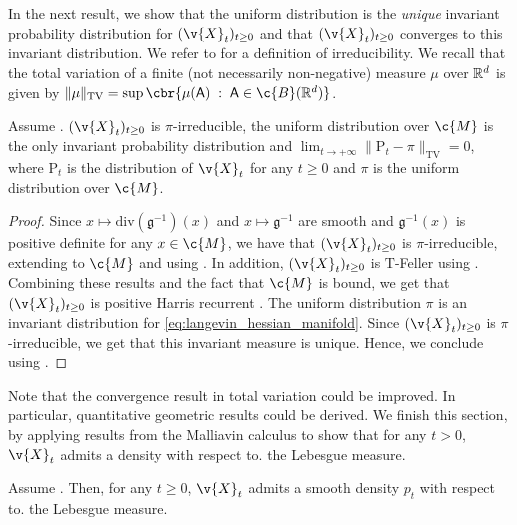 In the next result, we show that the uniform distribution is the \emph{unique} invariant probability distribution for \((\v{X}_t)_{t \geq 0}\) and that \((\v{X}_t)_{t \geq 0}\) converges to this invariant distribution.
We refer to \cite[Section 2, p.490]{meyn1993stability} for a definition of irreducibility.
We recall that the total variation of a finite (not necessarily non-negative) measure \(\mu\) over \(\mathbb{R}^d\) is given by \(\| \mu \|_{\mathrm{TV}} = \sup \cbr{\mu(\mathsf{A}) \; : \; \mathsf{A} \in \c{B}(\R^d)}\).

\begin{proposition}
	Assume \textup{}.
	\((\v{X}_t)_{t \geq 0}\) is
	\(\pi\)-irreducible, the uniform distribution over \(\c{M}\) is the only invariant
	probability distribution and
	\(\lim_{t \to +\infty} \|\mathrm{P}_t - \pi\|_{\mathrm{TV}} = 0\), where \(\mathrm{P}_t\) is
	the distribution of \(\v{X}_t\) for any \(t \geq 0\) and \(\pi\) is the uniform
	distribution over \(\c{M}\).
\end{proposition}

\begin{proof}
	Since \(x \mapsto \mathrm{div}(\mathfrak{g}^{-1})(x)\) and \(x \mapsto \mathfrak{g}^{-1}\) are smooth and \(\mathfrak{g}^{-1}(x)\) is positive definite for any \(x \in \c{M}\), we have that \((\v{X}_t)_{t \geq 0}\) is \(\pi\)-irreducible, extending \cite[Lemma 1.4]{bhattacharya1978criteria} to \(\c{M}\) and using \cite[Proposition 2.1]{meyn1993stability}.
	In addition, \((\v{X}_t)_{t \geq 0}\) is \(\mathrm{T}\)-Feller using \cite[Proposition 3.3]{meyn1993stability}.
	Combining these results and the fact that \(\c{M}\) is bound, we get that \((\v{X}_t)_{t \geq 0}\) is positive Harris recurrent \cite[Theorem 3.2]{meyn1993stability}.
	The uniform distribution \(\pi\) is an invariant distribution for \eqref{eq:langevin_hessian_manifold}.
	Since \((\v{X}_t)_{t \geq 0}\) is \(\pi\)-irreducible, we get that this invariant measure is unique.
	Hence, we conclude using \cite[Theorem 6.1]{meyn1993stability}.
\end{proof}

Note that the convergence result in total variation could be improved.
In particular, quantitative geometric results could be derived.
We finish this section, by applying results from the Malliavin calculus to show that for any \(t > 0\), \(\v{X}_t\) admits a density with respect to.
the Lebesgue measure.

\begin{proposition}
	Assume \textup{}.
	Then, for any \(t \geq 0\), \(\v{X}_t\) admits a smooth density \(p_t\) with respect to.
	the Lebesgue measure.
\end{proposition}

